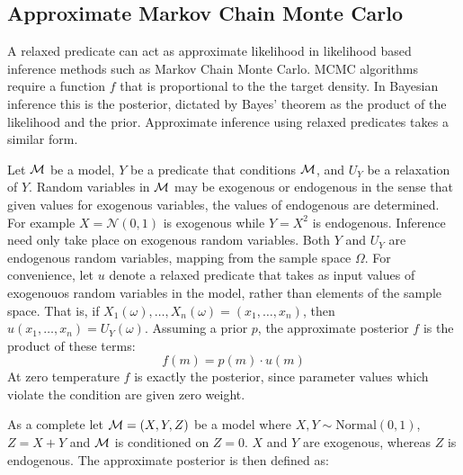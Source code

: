 


\subsection{Approximate Markov Chain Monte Carlo}
A relaxed predicate can act as approximate likelihood in likelihood based inference methods such as Markov Chain Monte Carlo.
MCMC algorithms require a function $f$ that is proportional to the the target density.
In Bayesian inference this is the posterior, dictated by Bayes' theorem as the product of the likelihood and the prior.
Approximate inference using relaxed predicates takes a similar form.

Let ${\mathcal{M}}$ be a model, $Y$ be a predicate that conditions ${\mathcal{M}}$, and $U_Y$ be a relaxation of $Y$.
Random variables in ${\mathcal{M}}$ may be exogenous or endogenous in the sense that
given values for exogenous variables, the values of endogenous are determined.
For example $X = \mathcal{N}(0,1)$ is exogenous while $Y = X^2$ is endogenous.
Inference need only take place on exogenous random variables.
Both $Y$ and $U_Y$ are endogenous random variables, mapping from the sample space $\Omega$.
For convenience, let $u$ denote a relaxed predicate that takes as input values of exogenouos random variables in the model, rather than elements of the sample space.
That is, if $X_1(\omega), \dots, X_n(\omega) = (x_1, \dots, x_n)$, then $u(x_1, \dots, x_n) = U_Y(\omega)$.
Assuming a prior $p$, the approximate posterior $f$ is the product of these terms:
\begin{equation}
f(m) = p(m) \cdot u(m)
\end{equation}
At zero temperature $f$ is exactly the posterior, since parameter values which violate the condition are given zero weight.

As a complete let ${\mathcal{M}} = (X, Y, Z)$ be a model where $X, Y \sim \textrm{Normal}(0, 1)$, $Z = X + Y$ and ${\mathcal{M}}$ is conditioned on $Z = 0$.
$X$ and $Y$ are exogenous, whereas $Z$ is endogenous.
The approximate posterior is then defined as:

